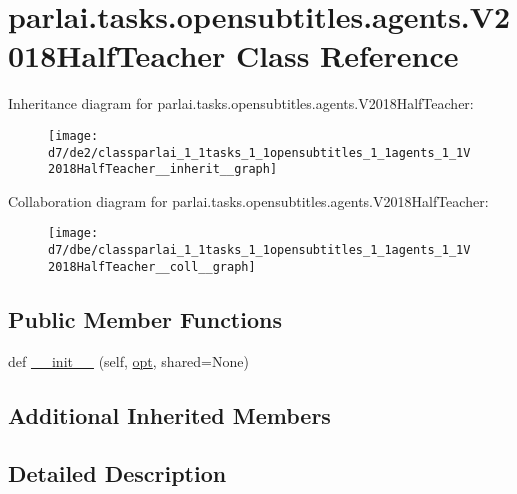 \hypertarget{classparlai_1_1tasks_1_1opensubtitles_1_1agents_1_1V2018HalfTeacher}{}\section{parlai.\+tasks.\+opensubtitles.\+agents.\+V2018\+Half\+Teacher Class Reference}
\label{classparlai_1_1tasks_1_1opensubtitles_1_1agents_1_1V2018HalfTeacher}


Inheritance diagram for parlai.\+tasks.\+opensubtitles.\+agents.\+V2018\+Half\+Teacher\+:\nopagebreak
\begin{figure}[H]
\begin{center}
\leavevmode
\texttt{[image: d7/de2/classparlai\_1\_1tasks\_1\_1opensubtitles\_1\_1agents\_1\_1V2018HalfTeacher\_\_inherit\_\_graph]}
\end{center}
\end{figure}


Collaboration diagram for parlai.\+tasks.\+opensubtitles.\+agents.\+V2018\+Half\+Teacher\+:\nopagebreak
\begin{figure}[H]
\begin{center}
\leavevmode
\texttt{[image: d7/dbe/classparlai\_1\_1tasks\_1\_1opensubtitles\_1\_1agents\_1\_1V2018HalfTeacher\_\_coll\_\_graph]}
\end{center}
\end{figure}
\subsection*{Public Member Functions}
\begin{DoxyCompactItemize}
\item 
def \hyperlink{classparlai_1_1tasks_1_1opensubtitles_1_1agents_1_1V2018HalfTeacher_ac42e92db06e46aa2a9fef8883bb17117}{\+\_\+\+\_\+init\+\_\+\+\_\+} (self, \hyperlink{classparlai_1_1core_1_1teachers_1_1FbDialogTeacher_af7a9ec497b9cd0292d7b8fa220da7c28}{opt}, shared=None)
\end{DoxyCompactItemize}
\subsection*{Additional Inherited Members}


\subsection{Detailed Description}


